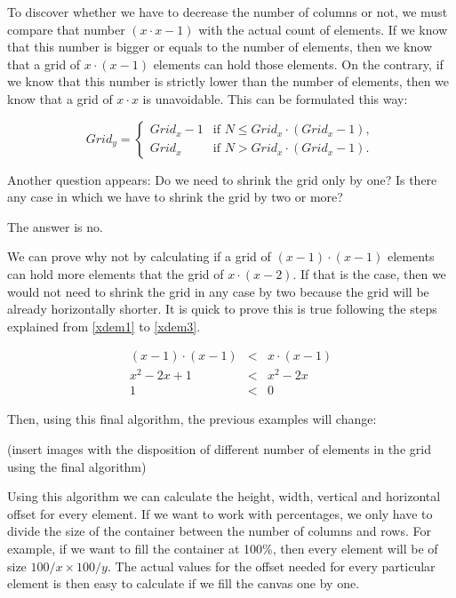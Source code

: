 To discover whether we have to decrease the number of columns or not, we must
compare that number $(x \cdot x - 1)$ with the actual count of elements. If we
know that this number is bigger or equals to the number of elements, then we
know that a grid of $x \cdot (x - 1)$ elements can hold those elements. On the
contrary, if we know that this number is strictly lower than the number of
elements, then we know that a grid of $x \cdot x$ is unavoidable. This can be
formulated this way:

\begin{equation}
  Grid_{y} = 
  \begin{cases}
    Grid_{x} - 1 & \text{if } N \leq Grid_{x} \cdot (Grid_{x} - 1),\\
    Grid_{x} & \text{if } N > Grid_{x} \cdot (Grid_{x} - 1).
  \end{cases} \label{gridy}
\end{equation}

Another question appears: Do we need to shrink the grid only by one?
Is there any case in which we have to shrink the grid by two or more?

The answer is no.

We can prove why not by calculating if a grid of $(x - 1) \cdot (x - 1)$
elements can hold more elements that the grid of $x \cdot (x - 2)$.
If that is the case, then we would not need to shrink the grid in any case by
two because the grid will be already horizontally shorter.
It is quick to prove this is true following the steps explained from
\eqref{xdem1} to \eqref{xdem3}.

\begin{eqnarray}
  (x-1) \cdot (x-1) &<& x \cdot (x-1) \label{xdem1} \\
  x^2-2x+1 &<& x^2-2x \label{xdem2} \\
  1 &<& 0 \label{xdem3}
\end{eqnarray}

Then, using this final algorithm, the previous examples will change:

(insert images with the disposition of different number of elements in the grid using the final algorithm)

Using this algorithm we can calculate the height, width, vertical and
horizontal offset for every element. If we want to work with percentages, we
only have to divide the size of the container between the number of columns
and rows. For example, if we want to fill the container at 100\%, then every
element will be of size $100/x \times 100/y$. The actual values
for the offset needed for every particular element is then easy to calculate
if we fill the canvas one by one.

